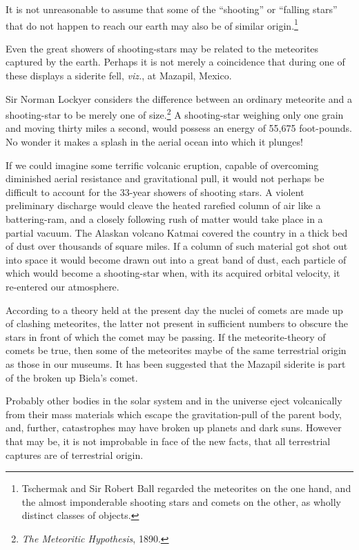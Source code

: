 \documentclass[a4paper, 12pt, oneside, landscape]{article}
\begin{document}
It is not unreasonable to assume that some of the ``shooting'' or ``falling stars'' that do not happen to reach our earth may also be of similar origin.\footnote{Tschermak and Sir Robert Ball regarded the meteorites on the one hand, and the almost imponderable shooting stars and comets on the other, as wholly distinct classes of objects.}

Even the great showers of shooting-stars may be related to the meteorites captured by the earth. Perhaps it is not merely a coincidence that during one of these displays a siderite fell, \emph{viz.}, at Mazapil, Mexico.

Sir Norman Lockyer considers the difference between an ordinary meteorite and a shooting-star to be merely one of size.\footnote{\emph{The Meteoritic Hypothesis}, 1890.} A shooting-star weighing only one grain and moving thirty miles a second, would possess an energy of 55,675 foot-pounds. No wonder it makes a splash in the aerial ocean into which it plunges!

If we could imagine some terrific volcanic eruption, capable of overcoming diminished aerial resistance and gravitational pull, it would not perhaps be difficult to account for the 33-year showers of shooting stars. A violent preliminary discharge would cleave the heated rarefied column of air like a battering-ram, and a closely following rush of matter would take place in a partial vacuum. The Alaskan volcano Katmai covered the country in a thick bed of dust over thousands of square miles. If a column of such material got shot out into space it would become drawn out into a great band of dust, each particle of which would become a shooting-star when, with its acquired orbital velocity, it re-entered our atmosphere.

According to a theory held at the present day the nuclei of comets are made up of clashing meteorites, the latter not present in sufficient numbers to obscure the stars in front of which the comet may be passing. If the meteorite-theory of comets be true, then some of the meteorites maybe of the same terrestrial origin as those in our museums. It has been suggested that the Mazapil siderite is part of the broken up Biela's comet.

Probably other bodies in the solar system and in the universe eject volcanically from their mass materials which escape the gravitation-pull of the parent body, and, further, catastrophes may have broken up planets and dark suns. However that may be, it is not improbable in face of the new facts, that all terrestrial captures are of terrestrial origin.
\end{document}
